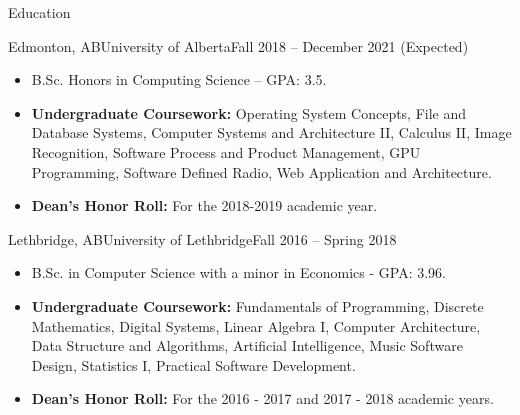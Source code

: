 \documentclass[]{mcdowellcv}
\begin{document}
\makeheader


\begin{cvsection}{Education}
  \begin{cvsubsection}{Edmonton, AB}{University of Alberta}{Fall 2018 -- December 2021 (Expected)}
    \begin{itemize}
      \item B.Sc. Honors in Computing Science -- GPA: 3.5.
      \item \textbf{Undergraduate Coursework:} 
        Operating System Concepts,
        File and Database Systems,
        Computer Systems and Architecture II,
        Calculus II,
        Image Recognition,
        Software Process and Product Management,
        GPU Programming, 
        Software Defined Radio, 
        Web Application and Architecture.
      \item \textbf{Dean's Honor Roll:} For the 2018-2019 academic year. 
    \end{itemize}
  \end{cvsubsection}

  \begin{cvsubsection}{Lethbridge, AB}{University of Lethbridge}{Fall 2016 -- Spring 2018}
    \begin{itemize}   
      \item B.Sc. in Computer Science with a minor in Economics - GPA: 3.96.
      \item \textbf{Undergraduate Coursework:} 
        Fundamentals of Programming,
        Discrete Mathematics,
        Digital Systems,
        Linear Algebra I,
        Computer Architecture,
        Data Structure and Algorithms,
        Artificial Intelligence,
        Music Software Design,
        Statistics I,
        Practical Software Development.
      \item \textbf{Dean's Honor Roll:} For the 2016 - 2017 and 2017 - 2018 academic years.
    \end{itemize}
  \end{cvsubsection}
\end{cvsection}
\end{document}

